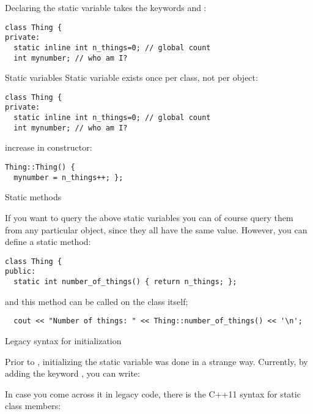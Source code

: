 Declaring the static variable takes the keywords
 and :
\begin{lstlisting}
class Thing {
private:
  static inline int n_things=0; // global count
  int mynumber; // who am I?
\end{lstlisting}

\begin{slide}{Static variables}
  \label{sl:static-var}
Static variable exists once per class, not per object:
\begin{lstlisting}
class Thing {
private:
  static inline int n_things=0; // global count
  int mynumber; // who am I?
\end{lstlisting}
increase in constructor:
\begin{lstlisting}
Thing::Thing() {
  mynumber = n_things++; };
\end{lstlisting}
\end{slide}

 {Static methods}

If you want to query the above static variables
you can of course query them from any particular object,
since they all have the same value.
However, you can define a static method:
\begin{lstlisting}
class Thing {
public:
  static int number_of_things() { return n_things; };
\end{lstlisting}
and this method can be called on the class itself;
\begin{lstlisting}
  cout << "Number of things: " << Thing::number_of_things() << '\n';
\end{lstlisting}

 {Legacy syntax for initialization}

Prior to , initializing the static variable was
done in a strange way. Currently, by adding the keyword ,
you can write:


\begin{comment}
  \Level 1 {Static members}
  \begin{block}{Static class members}
    \label{sl:static-member}
    A static member acts as if it's shared between all objects.\\
    (Note: C++17 syntax)
    \snippetwithoutput{classstatic17}{link}{static17}
  \end{block}
\end{comment}

In case you come across it in legacy code,
there is the C++11 syntax for static class members:


